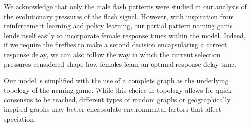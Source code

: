 We acknowledge that only the male flash patterns were studied in our analysis of the evolutionary pressures of the flash signal.
However, with inspiration from reinforcement learning and policy learning, our partial pattern naming game lends itself easily to incorporate female response times within the model. 
Indeed, if we require the fireflies to make a second decision encapsulating a correct response delay, we can also follow the way in which the current selection pressures considered shape how females learn an optimal response delay time. 

Our model is simplified with the use of a complete graph as the underlying topology of the naming game. 
While this choice in topology allows for quick consensus to be reached, different types of random graphs or geographically inspired graphs may better encapsulate environmental factors that affect speciation. 